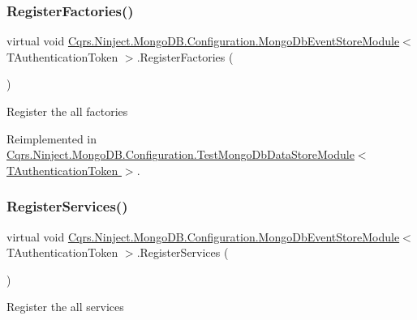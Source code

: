 \subsubsection{\texorpdfstring{Register\+Factories()}{RegisterFactories()}}
{\footnotesize\ttfamily virtual void \hyperlink{classCqrs_1_1Ninject_1_1MongoDB_1_1Configuration_1_1MongoDbEventStoreModule}{Cqrs.\+Ninject.\+Mongo\+D\+B.\+Configuration.\+Mongo\+Db\+Event\+Store\+Module}$<$ T\+Authentication\+Token $>$.Register\+Factories (\begin{DoxyParamCaption}{ }\end{DoxyParamCaption})\hspace{0.3cm}{\ttfamily [virtual]}}



Register the all factories 



Reimplemented in \hyperlink{classCqrs_1_1Ninject_1_1MongoDB_1_1Configuration_1_1TestMongoDbDataStoreModule_abff300412dc5c2602db5f51925204c6e_abff300412dc5c2602db5f51925204c6e}{Cqrs.\+Ninject.\+Mongo\+D\+B.\+Configuration.\+Test\+Mongo\+Db\+Data\+Store\+Module$<$ T\+Authentication\+Token $>$}.

\mbox{\label{classCqrs_1_1Ninject_1_1MongoDB_1_1Configuration_1_1MongoDbEventStoreModule_abbb71b43dadafb70410ef2ff491f5108_abbb71b43dadafb70410ef2ff491f5108}} 
\subsubsection{\texorpdfstring{Register\+Services()}{RegisterServices()}}
{\footnotesize\ttfamily virtual void \hyperlink{classCqrs_1_1Ninject_1_1MongoDB_1_1Configuration_1_1MongoDbEventStoreModule}{Cqrs.\+Ninject.\+Mongo\+D\+B.\+Configuration.\+Mongo\+Db\+Event\+Store\+Module}$<$ T\+Authentication\+Token $>$.Register\+Services (\begin{DoxyParamCaption}{ }\end{DoxyParamCaption})\hspace{0.3cm}{\ttfamily [virtual]}}



Register the all services 

